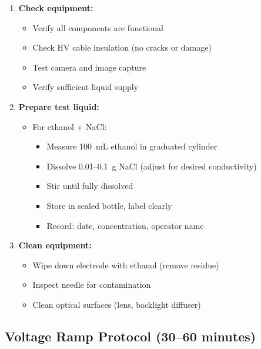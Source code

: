 \documentclass[11pt]{article}
\begin{document}
\begin{enumerate}
\item \textbf{Check equipment:}
  \begin{itemize}
  \item Verify all components are functional
  \item Check HV cable insulation (no cracks or damage)
  \item Test camera and image capture
  \item Verify sufficient liquid supply
  \end{itemize}

\item \textbf{Prepare test liquid:}
  \begin{itemize}
  \item For ethanol + NaCl:
    \begin{itemize}
    \item Measure 100~mL ethanol in graduated cylinder
    \item Dissolve 0.01--0.1~g NaCl (adjust for desired conductivity)
    \item Stir until fully dissolved
    \item Store in sealed bottle, label clearly
    \item Record: date, concentration, operator name
    \end{itemize}
  \end{itemize}

\item \textbf{Clean equipment:}
  \begin{itemize}
  \item Wipe down electrode with ethanol (remove residue)
  \item Inspect needle for contamination
  \item Clean optical surfaces (lens, backlight diffuser)
  \end{itemize}
\end{enumerate}

\subsection{Voltage Ramp Protocol (30--60 minutes)}
\end{document}
